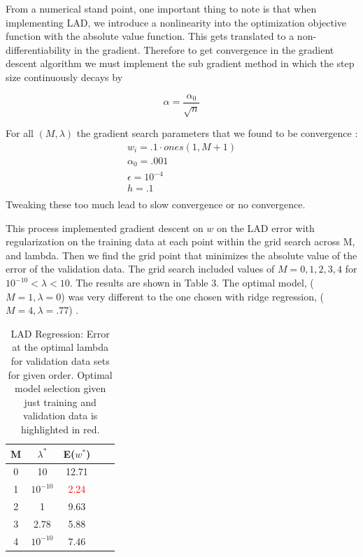 \documentclass[10pt,twocolumn]{article}
\begin{document}
From a numerical stand point, one important thing to note is that when implementing LAD, we introduce a nonlinearity into the optimization objective function with the absolute value function. This gets translated to a non-differentiability in the gradient. Therefore to get convergence in the gradient descent algorithm we must implement the sub gradient method in which the step size continuously decays by 

\begin{equation}
\alpha= \frac{\alpha_0 }{\sqrt{n}}
\end{equation}

For all $(M, \lambda)$ the gradient search parameters  that we found to be  convergence : 
\begin{align}
w_i =.1 \cdot ones(1, M+1) \\
\alpha_0 = .001 \\
\epsilon = 10^{-4} \\
h = .1 \\ 
\end{align}
Tweaking these too much lead to slow convergence or no convergence. 

This process implemented gradient descent on $w$ on the LAD error with regularization on the training data at each point within the grid search across M, and lambda. Then we find the grid point that minimizes the absolute value of the error of the validation data. The grid search included values of $M= {0,1,2,3,4}$  for $10^{-10} < \lambda <10 $. The results are shown in  Table 3. The optimal model, ($M=1, \lambda = 0$) was very different to the one chosen with ridge regression, ($M=4, \lambda=.77$) .
\begin{table}
\begin{center}
  \begin{tabular}{ | c | c | c | c | c | }
    \hline
     M & $\lambda ^*$  & E($w^*$) \\ \hline
     0 & 10 & 12.71  \\ \hline
     1 & $ 10^{-10}$ & \textcolor{red}{2.24}   \\ \hline
     2 & 1 & 9.63   \\ \hline
     3 & 2.78 & 5.88   \\ \hline
     4 & $10^{-10}$ & 7.46   \\ \hline
    
    \hline
  \end{tabular}
  \caption{LAD Regression: Error at the optimal lambda for validation data sets for given order. Optimal model selection given just training and validation data is highlighted in red. }
\end{center}
\label{table:ave_sse}
\end{table}
\end{document}

